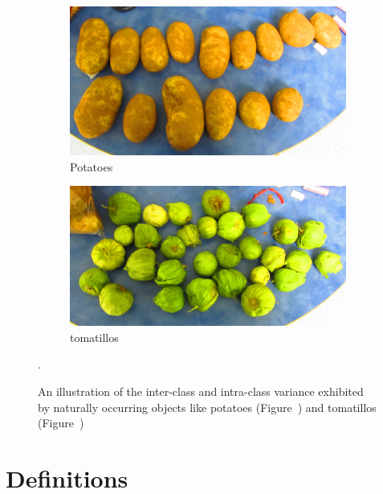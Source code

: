 \documentclass {udthesis}
\begin{document}
\begin{figure}
  \centering
  \begin{subfigure}[]{0.45\textwidth}
      \includegraphics[width=\textwidth]{potatoes_species}
      \caption{Potatoes}
      \label{fig:potato_species}
  \end{subfigure}
  \begin{subfigure}[]{0.45\textwidth}
      \includegraphics[width=\textwidth]{tomatillos_species}
      \caption{tomatillos}
      \label{fig:tomatillo_species}
  \end{subfigure}
\caption[Illustration of the inter-class and intra-class variance exhibited by naturally occurring objects]
{An illustration of the inter-class and intra-class variance exhibited by naturally occurring objects like 
potatoes (Figure~) and tomatillos (Figure~)}.
\label{fig:produce_species}
\end{figure}	
%
\section{Definitions}
\end{document}
